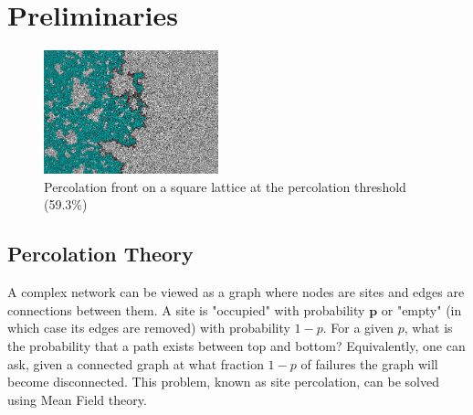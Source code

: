 \documentclass[11pt]{article}
\begin{document}
\section{Preliminaries}
\begin{figure}
  \vspace{-20pt}
  \begin{center}
    \includegraphics[width=0.45\textwidth]{Front_de_percolation.png}
  \end{center}
  \label{fig:phase_transition}
  \vspace{-20pt}
  \caption{Percolation front on a square lattice at the percolation threshold (59.3\%)}
\end{figure}

\subsection{Percolation Theory}
A complex network can be viewed as a graph where nodes are sites and edges are connections between them. A site is "occupied" with probability $\mathbf{p}$ or "empty" (in which case its edges are removed) with probability $1-p$. For a given $p$, what is the probability that a path exists between top and bottom? Equivalently, one can ask, given a connected graph at what fraction $1-p$ of failures the graph will become disconnected. This problem, known as site percolation, can be solved using Mean Field theory.
\end{document}
